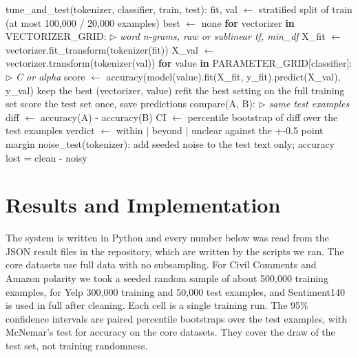 \documentclass[journal,onecolumn,12pt,a4paper]{IEEEtran}
\begin{document}
\begin{algorithm}[!t]
\footnotesize
\caption{Tuning, paired comparison and noise test}\label{alg:6}
\begin{algorithmic}[1]
\State tune\_and\_test(tokenizer, classifier, train, test):
\State \hspace*{1.0em}fit, val $\leftarrow$ stratified split of train (at most 100,000 / 20,000 examples)
\State \hspace*{1.0em}best $\leftarrow$ none
\State \hspace*{1.0em}\textbf{for} vectorizer \textbf{in} VECTORIZER\_GRID: \hfill{\scriptsize$\triangleright$ \textit{word n-grams, raw or sublinear tf, min\_df}}
\State \hspace*{2.0em}X\_fit $\leftarrow$ vectorizer.fit\_transform(tokenizer(fit))
\State \hspace*{2.0em}X\_val $\leftarrow$ vectorizer.transform(tokenizer(val))
\State \hspace*{2.0em}\textbf{for} value \textbf{in} PARAMETER\_GRID[classifier]: \hfill{\scriptsize$\triangleright$ \textit{C or alpha}}
\State \hspace*{3.0em}score $\leftarrow$ accuracy(model(value).fit(X\_fit, y\_fit).predict(X\_val), y\_val)
\State \hspace*{3.0em}keep the best (vectorizer, value)
\State \hspace*{1.0em}refit the best setting on the full training set
\State \hspace*{1.0em}score the test set once, save predictions
\Statex {}
\State compare(A, B): \hfill{\scriptsize$\triangleright$ \textit{same test examples}}
\State \hspace*{1.0em}diff $\leftarrow$ accuracy(A) - accuracy(B)
\State \hspace*{1.0em}CI   $\leftarrow$ percentile bootstrap of diff over the test examples
\State \hspace*{1.0em}verdict $\leftarrow$ within | beyond | unclear   against the +-0.5 point margin
\State noise\_test(tokenizer): add seeded noise to the test text only; accuracy lost = clean - noisy
\end{algorithmic}
\end{algorithm}

\section{Results and Implementation}\label{sec:4}
The system is written in Python and every number below was read from the JSON result files in the repository, which are written by the scripts we ran. The core datasets use full data with no subsampling. For Civil Comments and Amazon polarity we took a seeded random sample of about 500,000 training examples, for Yelp 300,000 training and 50,000 test examples, and Sentiment140 is used in full after cleaning. Each cell is a single training run. The 95\% confidence intervals are paired percentile bootstraps over the test examples, with McNemar's test for accuracy on the core datasets. They cover the draw of the test set, not training randomness.
\end{document}
